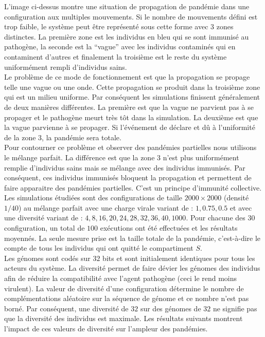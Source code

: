 L’image ci-dessus montre une situation de propagation de pandémie dans une configuration aux multiples mouvements. Si le nombre de mouvements défini est trop faible, le système peut être représenté sous cette forme avec $3$ zones distinctes. La première zone est les individus en bleu qui se sont immunisé au pathogène, la seconde est la “vague” avec les individus contaminés qui en contaminent d’autres et finalement la troisième est le reste du système uniformément rempli d’individus sains.\\ 

Le problème de ce mode de fonctionnement est que la propagation se propage telle une vague ou une onde. Cette propagation se produit dans la troisième zone qui est un milieu uniforme. Par conséquent les simulations finissent généralement de deux manières différentes. La première est que la vague ne parvient pas à se propager et le pathogène meurt très tôt dans la simulation. La deuxième est que la vague parvienne à se propager. Si l'événement de déclare et dû à l’uniformité de la zone $3$, la pandémie sera totale.\\ 

Pour contourner ce problème et observer des pandémies partielles nous utilisons le mélange parfait. La différence est que la zone $3$ n’est plus uniformément remplie d’individus sains mais se mélange avec des individus immunisés. Par conséquent, ces individus immunisés bloquent la propagation et permettent de faire apparaitre des pandémies partielles. C’est un principe d’immunité collective.\\ 

Les simulations étudiées sont des configurations de taille $2000 \times 2000$ (densité $1/40$) au mélange parfait avec une charge virale variant de : $1, 0.75, 0.5$ et avec une diversité variant de : $4,8,16,20,24,28,32,36,40,1000$. Pour chacune des $30$ configuration, un total de $100$ exécutions ont été effectuées et les résultats moyennés. La seule mesure prise est la taille totale de la pandémie, c'est-à-dire le compte de tous les individus qui ont quitté le compartiment $S$.\\

Les génomes sont codés sur $32$ bits et sont initialement identiques pour tous les acteurs du système. La diversité permet de faire dévier les génomes des individus afin de réduire la compatibilité avec l'agent pathogène (ceci le rend moins virulent). La valeur de diversité d'une configuration détermine le nombre de complémentations aléatoire sur la séquence de génome et ce nombre n'est pas borné. Par conséquent, une diversité de $32$ sur des génomes de $32$ ne signifie pas que la diversité des individus est maximale. Les résultats suivants montrent l'impact de ces valeurs de diversité sur l'ampleur des pandémies.

